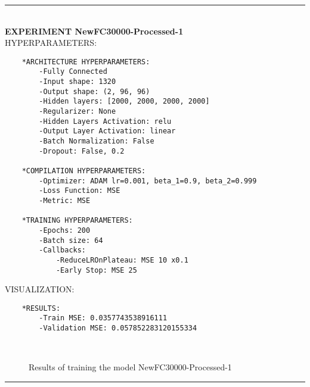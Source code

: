 \rule{0.5\textwidth}{0.5pt}\\

	{\large \textbf{EXPERIMENT NewFC30000-Processed-1}}\\
	
	{\normalsize HYPERPARAMETERS:}
	\begin{lstlisting}	
	*ARCHITECTURE HYPERPARAMETERS:
		-Fully Connected
		-Input shape: 1320
		-Output shape: (2, 96, 96)
		-Hidden layers: [2000, 2000, 2000, 2000]
		-Regularizer: None
		-Hidden Layers Activation: relu
		-Output Layer Activation: linear
		-Batch Normalization: False
		-Dropout: False, 0.2
	
	*COMPILATION HYPERPARAMETERS:
		-Optimizer: ADAM lr=0.001, beta_1=0.9, beta_2=0.999
		-Loss Function: MSE
		-Metric: MSE
	
	*TRAINING HYPERPARAMETERS:
		-Epochs: 200
		-Batch size: 64
		-Callbacks: 
			-ReduceLROnPlateau: MSE 10 x0.1
			-Early Stop: MSE 25
	\end{lstlisting}
	
	{\normalsize VISUALIZATION:}
	\begin{lstlisting}
	*RESULTS:
        -Train MSE: 0.0357743538916111
        -Validation MSE: 0.057852283120155334
	\end{lstlisting}
	
	\begin{figure*}[ht!]
		\hspace{\fill}
		\hspace{\fill}
		\\
		\caption{Results of training the model NewFC30000-Processed-1}
	\end{figure*}
	
\FloatBarrier
\rule{0.5\textwidth}{0.5pt}\\